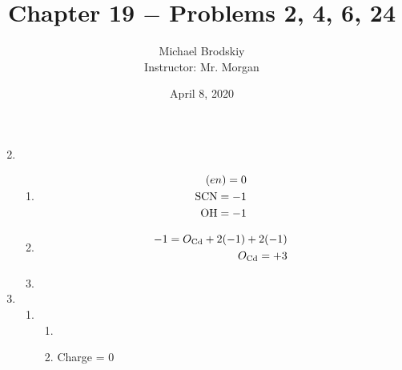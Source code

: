 \documentclass[12pt]{article}
\title{Chapter 19 $-$ Problems 2, 4, 6, 24}
\date{April 8, 2020}
\author{Michael Brodskiy\\ \small Instructor: Mr. Morgan}
\begin{document}
\maketitle

\begin{enumerate}

    \setcounter{enumi}{1}

  \item

    \begin{enumerate}

      \item 

        \begin{equation}
          \begin{split}
            (en)=0\\
            \ce{SCN}=-1\\
            \ce{OH}=-1\\
          \end{split}
          \label{1}
        \end{equation}

      \item 

        \begin{equation}
          \begin{split}
            -1 = O_{\ce{Cd}} + 2(-1) + 2(-1)\\
            O_{\ce{Cd}}=+3
          \end{split}
          \label{2}
        \end{equation}

      \item  {}

    \end{enumerate}

    \setcounter{enumi}{3}

  \item

    \begin{enumerate}

      \item 

        \begin{enumerate}

          \item {}

          \item Charge = 0


\end{enumerate}
\end{enumerate}
\end{enumerate}
\end{document}
